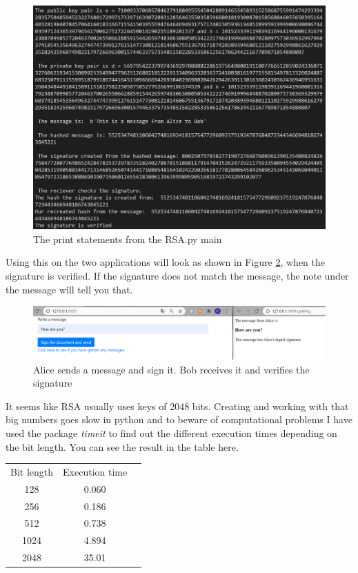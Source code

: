\documentclass[12pt, letterpaper]{article}
\begin{document}
\begin{figure}[H]
  \includegraphics[width=\linewidth]{code_snippets/print.PNG}\centering
  \caption{The print statements from the RSA.py main}
  \label{fig:print}
\end{figure}

Using this on the two applications will look as shown in Figure \ref{fig:msg}, when the signature is verified. If the signature does not match the message, the note under the message will tell you that.

\begin{figure}[H]
  \hspace*{-50px}\includegraphics[width=500px]{code_snippets/msg.PNG}\centering
  \caption{Alice sends a message and sign it. Bob receives it and verifies the signature}
  \label{fig:msg}
\end{figure}

It seems like RSA usually uses keys of 2048 bits. Creating and working with that big numbers goes slow in python and to beware of computational problems I have used the package \textit{timeit} to find out the different execution times depending on the bit length. You can see the result in the table here.

\begin{center}
\begin{tabular}{ |c|c|c| } 
 \hline
 Bit length & Execution time\\
 128 & 0.060 \\ 
 256 & 0.186 \\ 
 512 & 0.738 \\ 
 1024 & 4.894 \\ 
 2048 & 35.01 \\
 \hline
\end{tabular}
\end{center}
\end{document}
